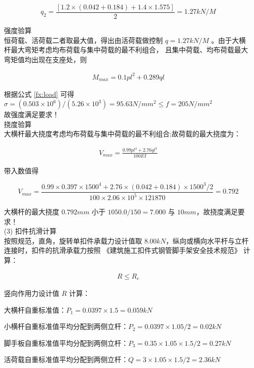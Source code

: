 $$q_2=\frac{[1.2\times(0.042+0.184)+1.4\times 1.575]}{2}=1.27 kN/M$$

 强度验算\\

恒荷载、活荷载二者取最大值，得出由活荷载做控制 $q=1.27 kN/M$ 。由于大横杆最大弯矩考虑均布荷载与集中荷载的最不利组合，
且集中荷载、均布荷载最大弯矩值均出现在支座处，则

\begin{align}
    M_{max}=0.1pl^2+0.289ql
\end{align}

根据公式 \ref{fx:load} 可得 $\sigma =(0.503\times 10^6)/(5.26\times 10^3)=95.63 N/mm^2 \leq f=205 N/mm^2$\\
故强度满足要求！\\

 挠度验算\\

大横杆最大挠度考虑均布荷载与集中荷载的最不利组合;故荷载的最大挠度为：

\begin{align}
    V_{max}=\frac{0.99pl^4+2.76ql^3}{100EI}
\end{align}

带入数值得

$$V_{max}=\frac{0.99\times 0.397\times 1500^4+2.76\times (0.042+0.184)\times 1500^3/2}{100\times 2.06\times 10^5\times 121870}=0.792$$

大横杆的最大挠度 $0.792mm$ 小于 $1050.0/150=7.000$ 与 $10mm$，故挠度满足要求！ \\

(3) 扣件抗滑计算\\

按照规范，直角，旋转单扣件承载力设计值取 $8.00kN$，纵向或横向水平杆与立杆连接时，扣件的抗滑承载力按照 《建筑施工扣件式钢管脚手架安全技术规范》 计算：

\begin{align}
    \label{fx:rc}
    R \leq R_c
\end{align}

竖向作用力设计值 $R$ 计算：

 大横杆自重标准值：$P_1=0.0397×1.5=0.059kN$

 小横杆自重标准值平均分配到两侧立杆：$P_2=0.0397×1.05/2=0.02kN$ 

 脚手板自重标准值平均分配到两侧立杆：$P_3=0.35×1.05×1.5/2=0.27kN$ 

 活荷载自重标准值平均分配到两侧立杆：$Q=3×1.05×1.5/2=2.36kN$

